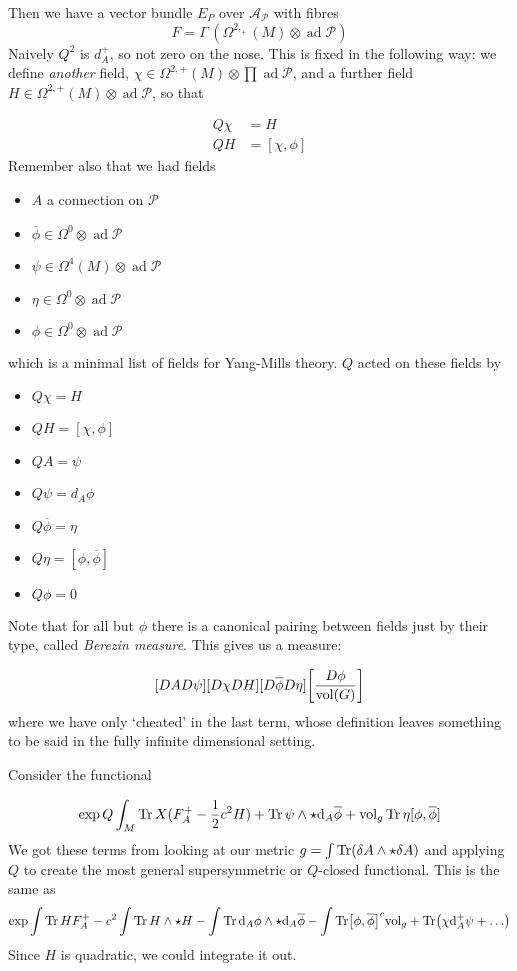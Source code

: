 \documentclass[leqno, openany]{memoir}
\theoremstyle{definition}
\theoremstyle{remark}
\theoremstyle{plain}
\theoremstyle{definition}
\theoremstyle{remark}
\newcommand{\mr}[1]{\mathrm{#1}}
\DeclareMathOperator{\ad}{ad}
\begin{document}
Then we have a vector bundle $E_{P}$ over $\mathcal{A}_{\mathcal{P}}$ with fibres
\[
F = \Gamma\, (\Omega^{2,_+}(M) \otimes \ad \mathcal{P})
\]
Naively $Q^{2}$ is $d_{A}^{+}$, so not zero on the nose. This is fixed in the following way: we define \emph{another} field, $\chi \in \Omega^{2,+}(M) \otimes \prod \ad\mathcal{P}$, and a further field $H \in \Omega^{2,+}(M) \otimes \ad\mathcal{P}$, so that

\begin{align}
    Q\chi &= H
  \\
    QH &= [\chi,\phi]
\end{align}
Remember also that we had fields
\begin{itemize}
  \item $A$ a connection on $\mathcal{P}$
  \item $\overline{\phi} \in \Omega^{0} \otimes \ad \mathcal{P}$
  \item $\psi \in \Omega^{4}(M) \otimes \ad \mathcal{P}$
  \item $\eta \in \Omega^{0} \otimes \ad\mathcal{P}$
        \item $\phi \in \Omega^{0} \otimes \ad\mathcal{P}$
\end{itemize}
which is a minimal list of fields for Yang-Mills theory. $Q$ acted on these fields by

\begin{itemize}
  \item $Q\chi = H$
  \item $QH = [\chi, \phi]$
  \item $QA = \psi$
  \item $Q\psi = d_{A} \phi$
  \item $Q\overline{\phi} = \eta$
  \item $Q\eta = [\phi,\overline{\phi}]$
        \item $Q\phi = 0$
\end{itemize}
Note that for all but $\phi$ there is a canonical pairing between fields just by their type, called \emph{Berezin measure}. This gives us a measure:

\[
[DA D\psi][D\chi DH] [D\overline{\phi} D\eta] \qty[\frac{D\phi}{\mr{vol}(G)}]
\]
where we have only `cheated' in the last term, whose definition leaves something to be said in the fully infinite dimensional setting.

Consider the functional

\[
\exp Q \int_{M} \Tr X(F_{A}^{+} - \frac{1}{2} c^{2} H) + \Tr \psi \wedge \star \dd_{A} \overline{\phi} + \mr{vol}_{g}\Tr \eta[\phi,\overline{\phi}]
\]
We got these terms from looking at our metric $g= \int \Tr(\delta A \wedge \star \delta A)$ and applying $Q$ to create the most general supersymmetric or $Q$-closed functional.
This is the same as
\[
\exp  \int \Tr H F_{A}^{+} - c^{2} \int \Tr H\wedge \star H- \int \Tr \dd_{A} \phi \wedge \star \dd_{A} \overline{\phi} - \int \Tr[\phi, \overline{\phi}]^{c} \mr{vol}_{g} + \Tr(\chi \dd_{A}^{+} \psi + \dots)
\]
Since $H$ is quadratic, we could integrate it out.
\end{document}
